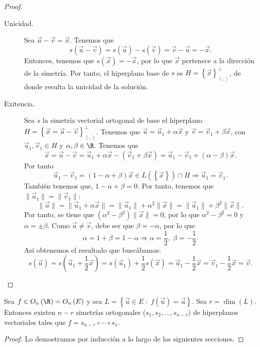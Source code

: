 \begin{proof}
\begin{description}
\item[Unicidad.] Sea $\displaystyle \vec{u}-\vec{v} = \vec{x} $. Tenemos que 
	\[s\left(\vec{u}-\vec{v}\right) = s\left(\vec{u}\right)-s\left(\vec{v}\right) = \vec{v}-\vec{u} = - \vec{x} .\]
	Entonces, tenemos que $\displaystyle s\left(\vec{x}\right) = -\vec{x} $, por lo que $\displaystyle \vec{x} $ pertenece a la dirección de la simetría. Por tanto, el hiperplano base de $\displaystyle s $ es $\displaystyle H = \left\{ \vec{x}\right\} ^{\perp }_{\left\langle ,  \right\rangle } $, de donde resulta la unicidad de la solución. 
\item[Exitencia.] Sea $\displaystyle s $ la simetría vectorial ortogonal de base el hiperplano $\displaystyle H = \left\{ \vec{x} = \vec{u}-\vec{v}\right\} ^{\perp }_{\left\langle ,  \right\rangle } $. Tenemos que $\displaystyle \vec{u} = \vec{u}_{1} + \alpha \vec{x} $ y $\displaystyle \vec{v} = \vec{v}_{1} +\beta \vec{x}$, con $\displaystyle \vec{u}_{1}, \vec{v}_{1} \in H $ y $\displaystyle \alpha, \beta \in \R $.
	Tenemos que
	\[ \vec{x} = \vec{u}-\vec{v} = \vec{u}_{1} +\alpha \vec{x} - \left(\vec{v}_{1} + \beta\vec{x}\right) = \vec{u}_{1}-\vec{v}_{1} + \left(\alpha - \beta \right)\vec{x} .\]
	Por tanto
	\[\vec{u}_{1}-\vec{v}_{1} = \left(1-\alpha+\beta\right)\vec{x} \in L(\left\{ \vec{x}\right\}) \cap H \Rightarrow \vec{u}_{1} = \vec{v}_{1} .\]
	También tenemos que, $\displaystyle 1-\alpha + \beta = 0$. Por tanto, tenemos que $\displaystyle \|\vec{u}_{1}\| = \|\vec{v}_{1}\| $: 
\[ \|\vec{u}\| = \|\vec{u}_{1}+\alpha\vec{x}\| = \|\vec{u}_{1}\|+\alpha^{2}\|\vec{x}\| = \|\vec{u}_{1}\| + \beta^{2}\|\vec{x}\| .\]
Por tanto, se tiene que $\displaystyle \left(\alpha^{2}-\beta^{2}\right)\|\vec{x}\| = 0 $, por lo que $\displaystyle \alpha^{2} -\beta^{2} = 0 $ y $\displaystyle \alpha = \pm \beta  $. Como $\displaystyle \vec{u} \neq \vec{v} $, debe ser que $\displaystyle \beta = - \alpha  $, por lo que
\[\alpha = 1 + \beta = 1 - \alpha \Rightarrow \alpha = \frac{1}{2}, \; \beta = - \frac{1}{2} .\]
Así obtenemos el resultado que buscábamos: 
\[s\left(\vec{u}\right) = s\left(\vec{u}_{1} + \frac{1}{2}\vec{x}\right) = s\left(\vec{u}_{1} \right)+\frac{1}{2}s\left(\vec{x}\right) = \vec{u}_{1} - \frac{1}{2}\vec{x} = \vec{v}_{1} - \frac{1}{2}\vec{x} = \vec{v} .\]
	\end{description}
\end{proof}
\begin{ftheorem}[]
	\normalfont Sea $\displaystyle f \in O_{n}\left(\R\right) = O_{n}\left(E\right) $ y sea $\displaystyle L = \left\{ \vec{u} \in E \; : \; f\left(\vec{u}\right) = \vec{u}\right\}  $. Sea $\displaystyle r = \dim\left(L\right) $. Entonces existen $\displaystyle n - r $ simetrías ortogonales ($\displaystyle s_{1}, s_{2}, \ldots, s_{n-r} $) de hiperplanos vectoriales tales que $\displaystyle f = s_{n-r}\circ \cdots \circ s_{1} $.
\end{ftheorem}
\begin{proof}
	Lo demostramos por inducción a lo largo de las siguientes secciones.  
		
\end{proof}
